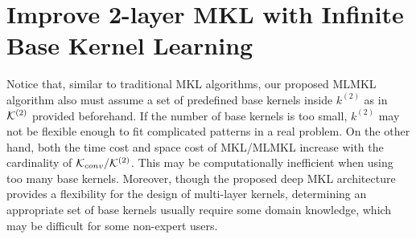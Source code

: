\section{Improve 2-layer MKL with Infinite Base Kernel Learning}

Notice that, similar to traditional MKL algorithms, our proposed MLMKL algorithm also must assume a set of predefined base kernels inside $k^{(2)}$ as in ${\mathcal K}^{(2)}$ provided beforehand. If the number of base kernels is too small, $k^{(2)}$ may not be flexible enough to fit complicated patterns in a real problem. On the other hand, both the time cost and space cost of MKL/MLMKL increase with the cardinality of ${\mathcal K}_{conv}/{\mathcal K}^{(2)}$.
This may be computationally inefficient when using too many base kernels. Moreover, though the proposed deep MKL architecture provides a flexibility for the design of multi-layer kernels, determining an appropriate set of base kernels usually require some domain knowledge, which may be difficult for some non-expert users.


